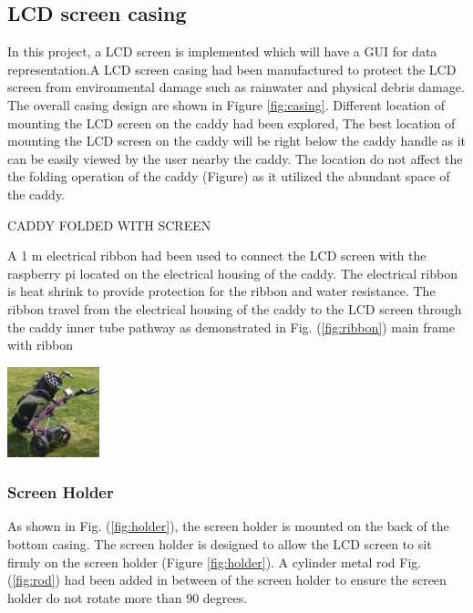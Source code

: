 \documentclass[11pt,landscape]{article}
\newenvironment{Figure}
  {\par\medskip\noindent\minipage{\linewidth}}
  {\endminipage\par\medskip}
\begin{document}
\begin{multicols}{3}
    \subsection{LCD screen casing}
    In this project, a LCD screen is implemented which will have a GUI for data
    representation.A LCD screen casing had been manufactured to protect the LCD
    screen from environmental damage such as rainwater and physical debris
    damage. The overall casing design are shown in Figure \ref{fig:casing}.
    Different location of mounting the LCD screen on the caddy had been
    explored, The best location of mounting the LCD screen on the caddy will be
    right below the caddy handle as it can be easily viewed by the user nearby
    the caddy. The location do not affect the the folding operation of the caddy
    (Figure) as it utilized the abundant space of the caddy. 
    
    CADDY FOLDED WITH SCREEN
    
    A 1 m electrical ribbon had been used to connect the LCD screen with the
    raspberry pi located on the electrical housing of the caddy. The electrical
    ribbon is heat shrink to provide protection for the ribbon and water
    resistance. The ribbon travel from the electrical housing of the caddy to
    the LCD screen through the caddy inner tube pathway as demonstrated in
     Fig. (\ref{fig:ribbon}) main frame with ribbon

    \begin{Figure}
        \begin{center}
            \includegraphics[width=0.2\textwidth]{Figure33.jpg}
            \label{fig:ribbon}
        \end{center}
    \end{Figure}
    
    \subsubsection{Screen Holder}
    As shown in Fig. (\ref{fig:holder}), the screen holder is mounted on the
    back of the bottom casing. The screen holder is designed to allow the LCD
    screen to sit firmly on the screen holder (Figure \ref{fig:holder}). A
    cylinder metal rod Fig. (\ref{fig:rod}) had been added in between of the
    screen holder to ensure the screen holder do not rotate more than 90 degrees.
    

\end{multicols}
\end{document}
